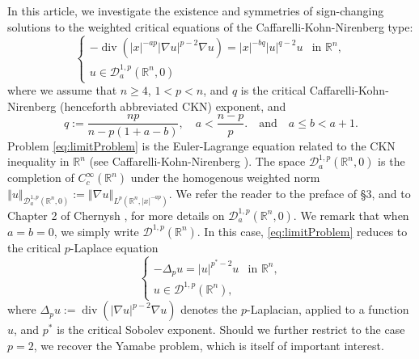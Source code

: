 \documentclass[10pt, reqno]{amsart}
\newcommand{\RR}{\mathbb{R}}
\newcommand{\abs}[1]{\left\vert #1 \right\vert}
\newcommand{\norm}[1]{\left\Vert #1 \right\Vert}
\newcommand{\D}{\mathcal{D}}
\numberwithin{equation}{section}
\theoremstyle{definition}
\theoremstyle{remark}
\theoremstyle{plain}
\begin{document}
	In this article, we investigate the existence and symmetries of sign-changing solutions to the weighted critical equations of the Caffarelli-Kohn-Nirenberg type:
	\begin{equation}\label{eq:limitProblem}
		\begin{cases}
			-\operatorname{div}\left( \abs{x}^{-ap} \abs{\nabla u}^{p-2} \nabla u\right) = \abs{x}^{-bq}\abs{u}^{q-2}u & \text{in } \RR^n,\\
			u \in \D^{1,p}_a(\RR^n,0)
		\end{cases}
	\end{equation}
	where we assume that $n \ge 4$, $1 < p < n$, and $q$ is the critical Caffarelli-Kohn-Nirenberg (henceforth abbreviated CKN) exponent, and
	\begin{equation}\label{eq:conditions}
		q := \frac{np}{n-p(1+a-b)}, \quad a < \frac{n-p}{p}. \quad \text{and} \quad a \leq b < a+1.
	\end{equation}
	Problem \eqref{eq:limitProblem} is the Euler-Lagrange equation related to the CKN inequality in $\RR^n$ (see Caffarelli-Kohn-Nirenberg \cite{caffarelli1984first}).
	The space $\D^{1,p}_a(\RR^n,0)$ is the completion of $C_c^\infty(\RR^n)$ under the homogenous weighted norm
	\(
	\norm{u}_{\D_a^{1,p}(\RR^n,0)} := \norm{\nabla u}_{L^p(\RR^n, \abs{x}^{-ap})}.
	\)
	We refer the reader to the preface of \S3, and to Chapter 2 of Chernysh \cite{mscChernysh}, for more details on $\D_a^{1,p}(\RR^n,0)$. We remark that when $a=b=0$, we simply write $\D^{1,p}(\RR^n)$. In this case, \eqref{eq:limitProblem} reduces to the critical $p$-Laplace equation 
	\begin{equation}\label{eq:unweighted}
		\begin{cases}
			-\Delta_p u = \abs{u}^{p^\ast-2}u & \text{in } \RR^n,\\
			u \in \D^{1,p}(\RR^n),
		\end{cases}
	\end{equation}
	where $\Delta_p u := \operatorname{div}\left( \abs{\nabla u}^{p-2}\nabla u\right)$ denotes the $p$-Laplacian, applied to a function $u$, and $p^\ast$ is the critical Sobolev exponent. Should we further restrict to the case $p=2$, we recover the Yamabe problem, which is itself of important interest.
	
\end{document}
